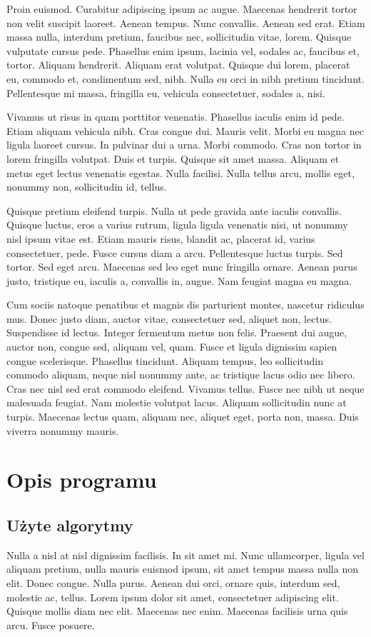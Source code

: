 \documentclass[eng,printmode]{mgr}
\begin{document}
Proin euismod. Curabitur adipiscing ipsum ac augue. Maecenas hendrerit tortor non velit suscipit laoreet. Aenean tempus. Nunc convallis. Aenean sed erat. Etiam massa nulla, interdum pretium, faucibus nec, sollicitudin vitae, lorem. Quisque vulputate cursus pede. Phasellus enim ipsum, lacinia vel, sodales ac, faucibus et, tortor. Aliquam hendrerit. Aliquam erat volutpat. Quisque dui lorem, placerat eu, commodo et, condimentum sed, nibh. Nulla eu orci in nibh pretium tincidunt. Pellentesque mi massa, fringilla eu, vehicula consectetuer, sodales a, nisi.

Vivamus ut risus in quam porttitor venenatis. Phasellus iaculis enim id pede. Etiam aliquam vehicula nibh. Cras congue dui. Mauris velit. Morbi eu magna nec ligula laoreet cursus. In pulvinar dui a urna. Morbi commodo. Cras non tortor in lorem fringilla volutpat. Duis et turpis. Quisque sit amet massa. Aliquam et metus eget lectus venenatis egestas. Nulla facilisi. Nulla tellus arcu, mollis eget, nonummy non, sollicitudin id, tellus.

Quisque pretium eleifend turpis. Nulla ut pede gravida ante iaculis convallis. Quisque luctus, eros a varius rutrum, ligula ligula venenatis nisi, ut nonummy nisl ipsum vitae est. Etiam mauris risus, blandit ac, placerat id, varius consectetuer, pede. Fusce cursus diam a arcu. Pellentesque luctus turpis. Sed tortor. Sed eget arcu. Maecenas sed leo eget nunc fringilla ornare. Aenean purus justo, tristique eu, iaculis a, convallis in, augue. Nam feugiat magna eu magna.

Cum sociis natoque penatibus et magnis dis parturient montes, nascetur ridiculus mus. Donec justo diam, auctor vitae, consectetuer sed, aliquet non, lectus. Suspendisse id lectus. Integer fermentum metus non felis. Praesent dui augue, auctor non, congue sed, aliquam vel, quam. Fusce et ligula dignissim sapien congue scelerisque. Phasellus tincidunt. Aliquam tempus, leo sollicitudin commodo aliquam, neque nisl nonummy ante, ac tristique lacus odio nec libero. Cras nec nisl sed erat commodo eleifend. Vivamus tellus. Fusce nec nibh ut neque malesuada feugiat. Nam molestie volutpat lacus. Aliquam sollicitudin nunc at turpis. Maecenas lectus quam, aliquam nec, aliquet eget, porta non, massa. Duis viverra nonummy mauris.


\chapter{Opis programu}
\section{Użyte algorytmy}
Nulla a nisl at nisl dignissim facilisis. In sit amet mi. Nunc ullamcorper, ligula vel aliquam pretium, nulla mauris euismod ipsum, sit amet tempus massa nulla non elit. Donec congue. Nulla purus. Aenean dui orci, ornare quis, interdum sed, molestie ac, tellus. Lorem ipsum dolor sit amet, consectetuer adipiscing elit. Quisque mollis diam nec elit. Maecenas nec enim. Maecenas facilisis urna quis arcu. Fusce posuere.
\end{document}
